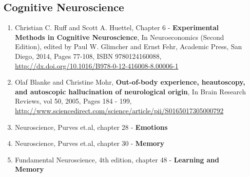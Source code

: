 \documentclass[12pt,article,oneside,a4paper]{memoir}
\begin{document}
\subsection{Cognitive Neuroscience}
\begin{enumerate}
\renewcommand{\labelenumi}{\textbf{\theenumi}}
\item Christian C. Ruff and Scott A. Huettel, Chapter 6 - \textbf{Experimental
Methods in Cognitive Neuroscience}, In Neuroeconomics (Second Edition), edited
by Paul W. Glimcher and Ernst Fehr, Academic Press, San Diego, 2014, Pages
77-108, ISBN 9780124160088,
\url{http://dx.doi.org/10.1016/B978-0-12-416008-8.00006-1}
\item Olaf Blanke and Christine Mohr, \textbf{Out-of-body experience,
heautoscopy, and autoscopic hallucination of neurological origin}, In Brain
Research Reviews, vol 50, 2005, Pages 184 - 199,
\url{http://www.sciencedirect.com/science/article/pii/S0165017305000792}
\label{ref:out-of-body}
\item Neuroscience, Purves et.al, chapter 28 - \textbf{Emotions}
\item Neuroscience, Purves et.al, chapter 30 - \textbf{Memory}
\item Fundamental Neuroscience, 4th edition, chapter 48 - \textbf{Learning and
Memory}
\end{enumerate}
\end{document}

